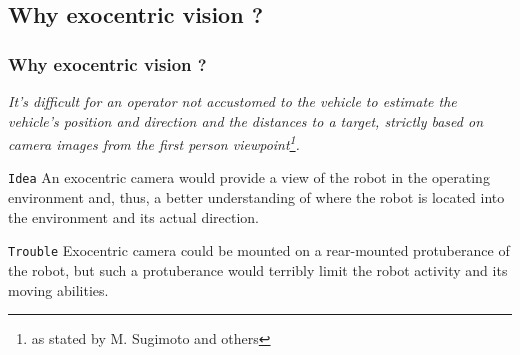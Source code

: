\subsection{Why exocentric vision ?}
\frame
{
  \frametitle{Why exocentric vision ?}
  
  \emph{It's difficult for an operator not accustomed to the vehicle
    to estimate the vehicle's position and direction and the distances to a target, strictly
    based on camera images from the first person viewpoint\footnote{\tiny{as stated by M. Sugimoto and others}}.}
  \pause
  
  \vskip15pt

  \begin{block} {\alert{\texttt{Idea}}}
    An exocentric camera would provide a view of the robot in the operating
    environment and, thus, a better understanding of where the robot is located into the
    environment and its actual direction.
  \end{block}
  
  \pause
    
  \vskip5pt
  
  \begin{block} {\alert{\texttt{Trouble}}}
    Exocentric camera could be mounted on a rear-mounted protuberance of the robot,
    but such a protuberance would terribly limit the robot activity and its moving abilities.
  \end{block}
  
}

